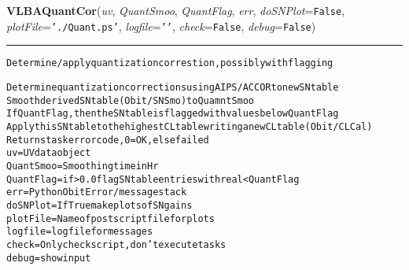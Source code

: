     \begin{boxedminipage}{\textwidth}

    \raggedright \textbf{VLBAQuantCor}(\textit{uv}, \textit{QuantSmoo}, \textit{QuantFlag}, \textit{err}, \textit{doSNPlot}=\texttt{F\-a\-l\-s\-e\-}, \textit{plotFile}=\texttt{'\-.\-/\-Q\-u\-a\-n\-t\-.\-p\-s\-'\-}, \textit{logfile}=\texttt{'\-'\-}, \textit{check}=\texttt{F\-a\-l\-s\-e\-}, \textit{debug}=\texttt{F\-a\-l\-s\-e\-})

    \vspace{-1.5ex}

    \rule{\textwidth}{0.5\fboxrule}
\begin{alltt}
Determine/apply quantization correstion, possibly with flagging

Determine quantization corrections using AIPS/ACCOR to new SN table
Smooth derived SN table (Obit/SNSmo) to QuamntSmoo
If QuantFlag, then the SN table is flagged with values below QuantFlag
Apply this SN table to the highest CL table writing a new CL table (Obit/CLCal)
Returns task error code, 0=OK, else failed
uv         = UV data object
QuantSmoo  = Smoothing time in Hr
QuantFlag  = if {\textgreater}0.0 flag SN table entries with real{\textless}QuantFlag
err        = Python Obit Error/message stack
doSNPlot   = If True make plots of SN gains
plotFile   = Name of postscript file for plots
logfile    = logfile for messages
check      = Only check script, don't execute tasks
debug      = show input\end{alltt}

    \vspace{1ex}

    \end{boxedminipage}

    \label{VLBACal:VLBARefMB}
    \vspace{0.5ex}

